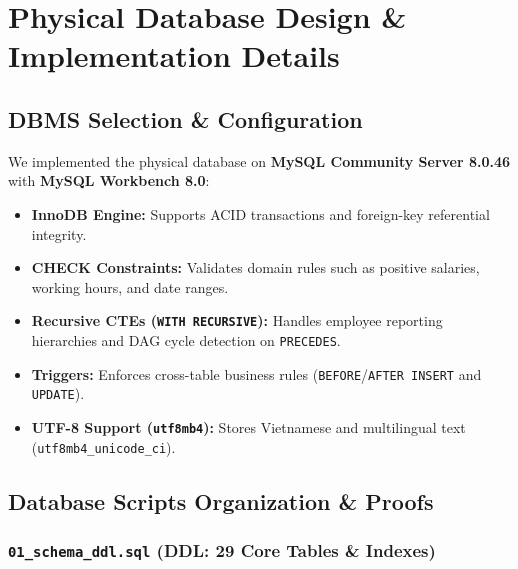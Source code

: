 \documentclass[a4paper,12pt]{report}
\begin{document}
\chapter{Physical Database Design \& Implementation Details}\label{physical-database-design-implementation-details}

\section{DBMS Selection \& Configuration}\label{dbms-selection-configuration}

We implemented the physical database on \textbf{MySQL Community Server 8.0.46} with \textbf{MySQL Workbench 8.0}:

\begin{itemize}
\item
  \textbf{InnoDB Engine:} Supports ACID transactions and foreign-key referential integrity.
\item
  \textbf{CHECK Constraints:} Validates domain rules such as positive salaries, working hours, and date ranges.
\item
  \textbf{Recursive CTEs (\texttt{WITH RECURSIVE}):} Handles employee reporting hierarchies and DAG cycle detection on \texttt{PRECEDES}.
\item
  \textbf{Triggers:} Enforces cross-table business rules (\texttt{BEFORE}/\texttt{AFTER INSERT} and \texttt{UPDATE}).
\item
  \textbf{UTF-8 Support (\texttt{utf8mb4}):} Stores Vietnamese and multilingual text (\texttt{utf8mb4\_\allowbreak{}unicode\_\allowbreak{}ci}).
\end{itemize}

\section{Database Scripts Organization \& Proofs}\label{database-scripts-organization-proofs}

\subsection{\texorpdfstring{\texttt{01\_\allowbreak{}schema\_\allowbreak{}ddl.\allowbreak{}sql} (DDL: 29 Core Tables \& Indexes)}{01schemaddl.sql (DDL: 29 Core Tables \& Indexes)}}\label{schema_ddl.sql-ddl-29-core-tables-indexes}
\end{document}
